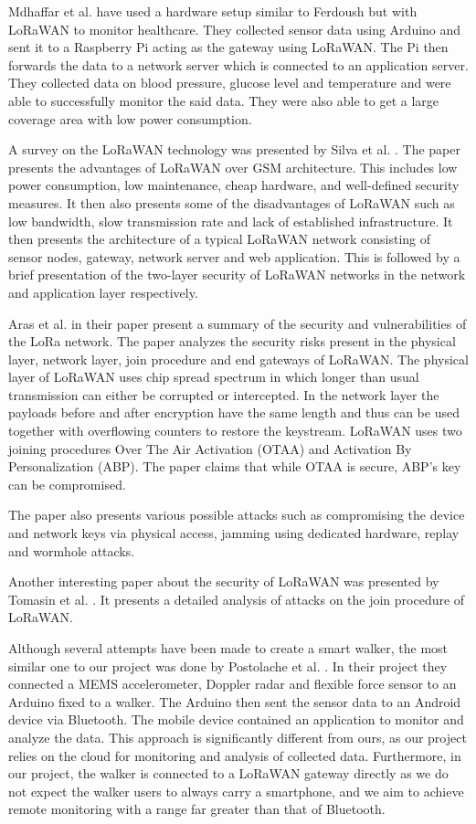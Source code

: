 Mdhaffar et al. \cite{mdhaffar2017iot} have used a hardware setup similar to Ferdoush but with LoRaWAN to monitor healthcare. They collected sensor data using Arduino and sent it to a Raspberry Pi acting as the gateway using LoRaWAN. The Pi then forwards the data to a network server which is connected to an application server. They collected data on blood pressure, glucose level and temperature and were able to successfully monitor the said data. They were also able to get a large coverage area with low power consumption. 


A survey on the LoRaWAN technology was presented by Silva et al. \cite{de2017lorawan}. The paper presents the advantages of LoRaWAN over GSM architecture. This includes low power consumption, low maintenance, cheap hardware, and well-defined security measures. It then also presents some of the disadvantages of LoRaWAN such as low bandwidth, slow transmission rate and lack of established infrastructure. It then presents the architecture of a typical LoRaWAN network consisting of sensor nodes, gateway, network server and web application. 
This is followed by a brief presentation of the two-layer security of LoRaWAN networks in the network and application layer respectively.

Aras et al. \cite{aras2017exploring} in their paper present a summary of the security and vulnerabilities of the LoRa network. The paper analyzes the security risks present in the physical layer, network layer, join procedure and end gateways of LoRaWAN. The physical layer of LoRaWAN uses chip spread spectrum in which longer than usual transmission can either be corrupted or intercepted. In the network layer the payloads before and after encryption have the same length and thus can be used together with overflowing counters to restore the keystream. LoRaWAN uses two joining procedures Over The Air Activation (OTAA) and Activation By Personalization (ABP). The paper claims that while OTAA is secure, ABP's key can be compromised.

The paper also presents various possible attacks such as compromising the device and network keys via physical access, jamming using dedicated hardware, replay and wormhole attacks.

Another interesting paper about the security of LoRaWAN was presented by Tomasin et al. \cite{tomasin2017security}. It presents a detailed analysis of attacks on the join procedure of LoRaWAN.

Although several attempts have been made to create a smart walker, the most similar one to our project was done by Postolache et al. \cite{postolache2011smart}. In their project they connected a MEMS accelerometer, Doppler radar and flexible force sensor to an Arduino fixed to a walker. The Arduino then sent the sensor data to an Android device via Bluetooth. The mobile device contained an application to monitor and analyze the data. This approach is significantly different from ours, as our project relies on the cloud for monitoring and analysis of collected data. Furthermore, in our project, the walker is connected to a LoRaWAN gateway directly as we do not expect the walker users to always carry a smartphone, and we aim to achieve remote monitoring with a range far greater than that of Bluetooth.

